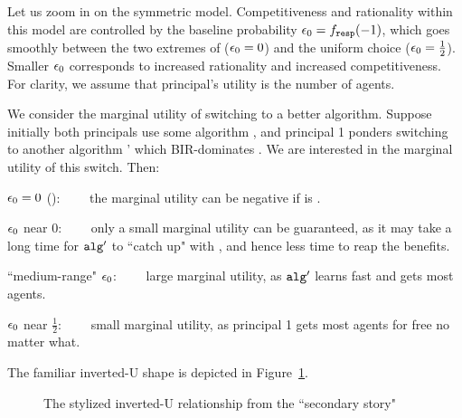 Let us zoom in on the symmetric  \HardMaxRandom model. {Competitiveness and rationality within this model are controlled by the baseline probability $\epsilon_0 = f_{\mathtt{resp}}(- 1)$, which goes smoothly between the two extremes of \HardMax ($\epsilon_0=0$) and the uniform choice ($\epsilon_0=\tfrac12$). Smaller $\epsilon_0$ corresponds to increased rationality and increased competitiveness.} For clarity, we assume that principal's utility is the number of agents.

We consider the marginal utility of switching to a better algorithm. Suppose initially both principals use some algorithm \alg, and principal 1 ponders switching to another algorithm \alg' which BIR-dominates \alg. {We are interested in the marginal utility of this switch. Then:}

\begin{OneLiners}
\item $\epsilon_0 = 0$ (\HardMax):~~~~ the marginal utility can be negative if \alg is \DynGreedy.

\item $\epsilon_0$ near $0$:~~~~ only a small marginal utility can be guaranteed, as it may take a long time for $\mathtt{alg}_{}'$ to ``catch up" with \alg, and hence less time to reap the benefits.

\item ``medium-range" $\epsilon_0$:~~~~ large marginal utility, as $\mathtt{alg}_{}'$ learns fast and gets most agents.

\item $\epsilon_0$ near $\tfrac12$:~~~~ small marginal utility, as principal 1 gets most agents for free no matter what.
\end{OneLiners}
The familiar inverted-U shape is depicted in Figure~\ref{fig:inverted-U3}.

\begin{figure}[t]
\begin{center}

\caption{The stylized inverted-U relationship from the ``secondary story"}
\label{fig:inverted-U3}
\end{center}
\end{figure}


